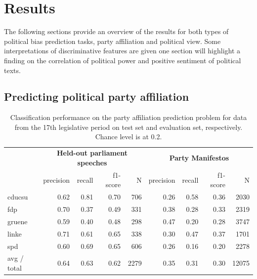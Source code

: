 \documentclass[runningheads,a4paper]{llncs}
\begin{document}
\section{Results}

The following sections provide an overview of the results for both types of political bias prediction tasks, party affiliation and political view. Some interpretations of discriminative features are given one section will highlight a finding on the correlation of political power and positive sentiment of political texts. 

\subsection{Predicting political party affiliation}


\begin{table}[t]
\begin{center}
\begin{tabular}{lrrrrrrrr}
& \multicolumn{4}{c}{\bf Held-out parliament speeches} & \multicolumn{4}{c}{\bf Party Manifestos}\\
    &         precision    &recall &  f1-score  & N    &         precision    &recall &  f1-score  & N\\
\hline \hline
       cducsu   &    0.62  &    0.81  &    0.70  &     706&0.26    &  0.58   &   0.36    &  2030\\
        fdp    &   0.70   &   0.37  &    0.49    &   331&0.38   &   0.28    &  0.33   &   2319\\
     gruene &      0.59  &    0.40   &   0.48   &    298&0.47  &    0.20   &   0.28 &     3747\\
      linke    &   0.71   &   0.61  &    0.65    &   338&0.30   &   0.47   &   0.37    &  1701\\
        spd   &    0.60   &   0.69  &    0.65   &    606&0.26   &   0.16   &   0.20  &    2278\\
\hline
avg / total &      0.64   &   0.63   &   0.62    &  2279 &0.35    &  0.31 &     0.30   &  12075
%
\end{tabular}
\end{center}
\caption{
\label{tab:results_four_classes}
Classification performance on the party affiliation prediction problem for data from the 17th legislative period on test set and evaluation set, respectively. Chance level is at 0.2.  
}
\end{table}
\end{document}
